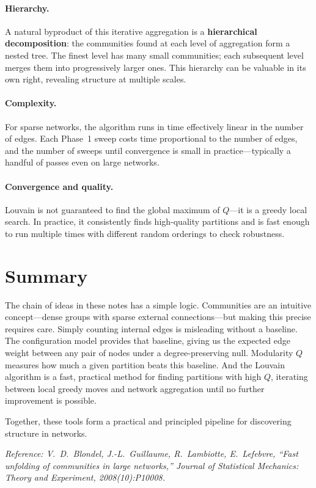\documentclass[11pt]{article}
\theoremstyle{definition}
\begin{document}
\paragraph{Hierarchy.} A natural byproduct of this iterative aggregation is a \textbf{hierarchical decomposition}: the communities found at each level of aggregation form a nested tree. The finest level has many small communities; each subsequent level merges them into progressively larger ones. This hierarchy can be valuable in its own right, revealing structure at multiple scales.

\paragraph{Complexity.} For sparse networks, the algorithm runs in time effectively linear in the number of edges. Each Phase~1 sweep costs time proportional to the number of edges, and the number of sweeps until convergence is small in practice---typically a handful of passes even on large networks.

\paragraph{Convergence and quality.} Louvain is not guaranteed to find the global maximum of $Q$---it is a greedy local search. In practice, it consistently finds high-quality partitions and is fast enough to run multiple times with different random orderings to check robustness.

\section{Summary}

The chain of ideas in these notes has a simple logic. Communities are an intuitive concept---dense groups with sparse external connections---but making this precise requires care. Simply counting internal edges is misleading without a baseline. The configuration model provides that baseline, giving us the expected edge weight between any pair of nodes under a degree-preserving null. Modularity $Q$ measures how much a given partition beats this baseline. And the Louvain algorithm is a fast, practical method for finding partitions with high $Q$, iterating between local greedy moves and network aggregation until no further improvement is possible.

Together, these tools form a practical and principled pipeline for discovering structure in networks.

\bigskip
\noindent\textit{Reference: V.~D.~Blondel, J.-L.~Guillaume, R.~Lambiotte, E.~Lefebvre, ``Fast unfolding of communities in large networks,'' Journal of Statistical Mechanics: Theory and Experiment, 2008(10):P10008.}
\end{document}
